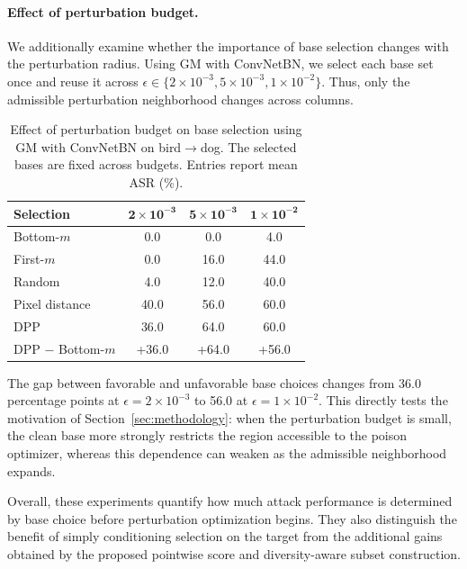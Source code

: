 \paragraph{Effect of perturbation budget.}
We additionally examine whether the importance of base selection changes
with the perturbation radius. Using GM with ConvNetBN, we select each
base set once and reuse it across
$\epsilon\in\{2\times10^{-3},5\times10^{-3},1\times10^{-2}\}$. Thus, only
the admissible perturbation neighborhood changes across columns.

\begin{table}[!ht]
\centering
\caption{
Effect of perturbation budget on base selection using GM with ConvNetBN
on bird$\rightarrow$dog. The selected bases are fixed across budgets.
Entries report mean ASR (\%).
}
\label{tab:selection-ladder-budget}
\small
\setlength{\tabcolsep}{9pt}
\renewcommand{\arraystretch}{1.08}
\begin{tabular}{lccc}
\toprule
\textbf{Selection} &
$\boldsymbol{2{\times}10^{-3}}$ &
$\boldsymbol{5{\times}10^{-3}}$ &
$\boldsymbol{1{\times}10^{-2}}$ \\
\midrule
Bottom-$m$      & 0.0 & 0.0 & 4.0 \\
First-$m$       & 0.0 & 16.0 & 44.0 \\
Random          & 4.0 & 12.0 & 40.0 \\
Pixel distance  & 40.0 & 56.0 & 60.0 \\
DPP             & 36.0 & 64.0 & 60.0 \\
\midrule
DPP $-$ Bottom-$m$ & +36.0 & +64.0 & +56.0 \\
\bottomrule
\end{tabular}
\end{table}

The gap between favorable and unfavorable base choices changes from 36.0
percentage points at $\epsilon=2\times10^{-3}$ to 56.0 at
$\epsilon=1\times10^{-2}$. This directly tests the motivation of
Section~\ref{sec:methodology}: when the perturbation budget is small,
the clean base more strongly restricts the region accessible to the
poison optimizer, whereas this dependence can weaken as the admissible
neighborhood expands.

Overall, these experiments quantify how much attack performance is
determined by base choice before perturbation optimization begins.
They also distinguish the benefit of simply conditioning selection on
the target from the additional gains obtained by the proposed
pointwise score and diversity-aware subset construction.